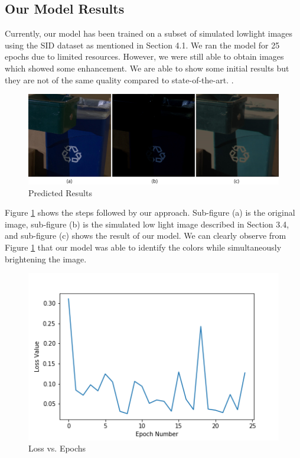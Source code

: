 \documentclass{article}
\begin{document}
\subsection{Our Model Results}

Currently, our model has been trained on a subset of simulated lowlight
images using the SID dataset as mentioned in Section 4.1. We ran the model
for 25 epochs due to limited resources. However, we were still able to obtain
images which showed some enhancement. We are able to show some initial
results but they are not of the same quality compared to state-of-the-art.
\cite{chen2018learning}. 

\begin{figure}[ht]
  \centering
  \includegraphics[scale=0.1]{trashcan_original_simmulated_and_our_result}
  \caption{ Predicted Results}
  \label{fig:ourmodel}
\end{figure}

Figure \ref{fig:ourmodel} shows the steps followed by our approach.
Sub-figure (a) is the original image, sub-figure (b) is the simulated low
light image described in Section 3.4, and sub-figure (c) shows the result
of our model. We can clearly observe from Figure \ref{fig:ourmodel} that
our model was able to identify the colors while simultaneously brightening
the image.

\begin{figure}[ht]
  \centering
  \includegraphics[scale=0.65]{loss_epoch_our_model}
  \caption{ Loss vs. Epochs}
  \label{fig:ourloss}
\end{figure}
\end{document}
